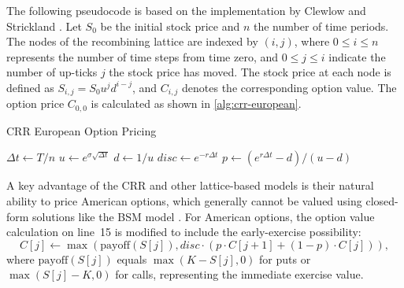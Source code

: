 \documentclass[english,12pt,a4paper,pdftex,sci,utf8]{aaltothesis}
\begin{document}
The following pseudocode is based on the implementation by Clewlow and Strickland \cite{clewlow1998implementing}. Let $S_0$ be the initial stock price and $n$ the number of time periods. The nodes of the recombining lattice are indexed by $(i,j)$, where $0 \leq i \leq n$ represents the number of time steps from time zero, and $0 \le j \le i$ indicate the number of up-ticks $j$ the stock price has moved. The stock price at each node is defined as $S_{i,j} = S_0u^jd^{i-j}$, and $C_{i,j}$ denotes the corresponding option value. The option price  $C_{0,0}$ is calculated as shown in \cref{alg:crr-european}.

\begin{algorithm}
\LinesNumbered
\caption{CRR European Option Pricing}
\label{alg:crr-european}

$\Delta t \gets T/n$\;
$u \gets e^{\sigma\sqrt{\Delta t}}$\;
$d \gets 1/u$\;
$disc \gets e^{-r\Delta t}$\;
$p \gets (e^{r\Delta t} - d)/(u - d)$\;

\BlankLine
{}

\BlankLine
{}

\BlankLine
{}
 
\;
\end{algorithm}

A key advantage of the CRR and other lattice-based models is their natural ability to price American options, which generally cannot be valued using closed-form solutions like the BSM model \cite{wilmott2013paul}. For American options, the option value calculation on line~15 is modified to include the early-exercise possibility:
\begin{equation*}
C[j] \gets \max(\text{payoff}(S[j]), disc \cdot (p \cdot C[j+1] + (1-p) \cdot C[j])),
\end{equation*}
where $\text{payoff}(S[j])$ equals $\max(K - S[j], 0)$ for puts or $\max(S[j] - K, 0)$ for calls, representing the immediate exercise value.
\end{document}
